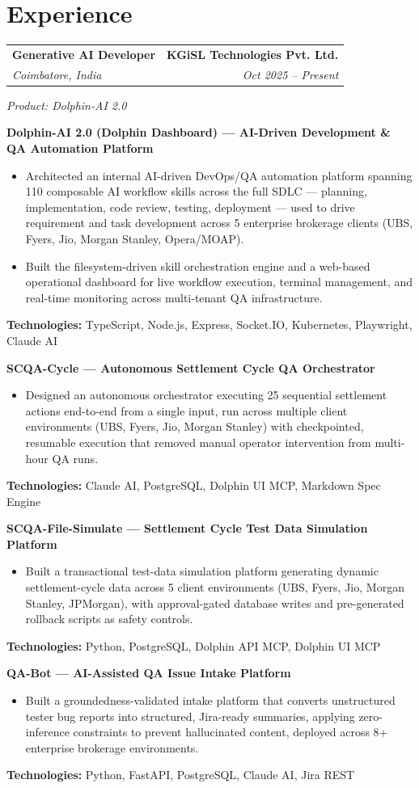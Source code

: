 \documentclass[11pt, letterpaper]{article}
\makeatletter
\newcommand{\jobheading}[4]{%
    \noindent\begin{tabularx}{\textwidth}{@{}X r@{}}
        \fontsize{12}{14}\selectfont\textbf{#1} & \fontsize{12}{14}\selectfont\textbf{#2} \\
        \fontsize{11}{13}\selectfont\textit{#3} & \fontsize{11}{13}\selectfont\textit{#4}
    \end{tabularx}\vspace{2pt}
}
\newcommand{\projectheading}[1]{%
    \vspace{5pt}
    \noindent\fontsize{11}{13}\selectfont\textbf{#1}
    \vspace{3pt}
}
\newcommand{\bulletpoints}[1]{%
    \begin{itemize}[leftmargin=1.4em, itemsep=2pt, topsep=2pt]
        #1
    \end{itemize}
    \vspace{2pt}
}
\newcommand{\bulletitem}[1]{%
    \item \fontsize{11}{12}\selectfont #1
}
\newcommand{\techline}[1]{%
    \noindent\fontsize{10}{12}\selectfont\textbf{Technologies:} #1
    \vspace{4pt}
}
\makeatother
\begin{document}
\vspace{4pt}

\section{Experience}
\jobheading{Generative AI Developer}{KGiSL Technologies Pvt. Ltd.}{Coimbatore, India}{Oct 2025 -- Present}
\noindent\fontsize{11}{13}\selectfont\textit{Product: Dolphin-AI 2.0}\vspace{4pt}

\projectheading{Dolphin-AI 2.0 (Dolphin Dashboard) --- AI-Driven Development \& QA Automation Platform}
\bulletpoints{
\bulletitem{Architected an internal AI-driven DevOps/QA automation platform spanning 110 composable AI workflow skills across the full SDLC --- planning, implementation, code review, testing, deployment --- used to drive requirement and task development across 5 enterprise brokerage clients (UBS, Fyers, Jio, Morgan Stanley, Opera/MOAP).}
\bulletitem{Built the filesystem-driven skill orchestration engine and a web-based operational dashboard for live workflow execution, terminal management, and real-time monitoring across multi-tenant QA infrastructure.}
}
\techline{TypeScript, Node.js, Express, Socket.IO, Kubernetes, Playwright, Claude AI}

\projectheading{SCQA-Cycle --- Autonomous Settlement Cycle QA Orchestrator}
\bulletpoints{
\bulletitem{Designed an autonomous orchestrator executing 25 sequential settlement actions end-to-end from a single input, run across multiple client environments (UBS, Fyers, Jio, Morgan Stanley) with checkpointed, resumable execution that removed manual operator intervention from multi-hour QA runs.}
}
\techline{Claude AI, PostgreSQL, Dolphin UI MCP, Markdown Spec Engine}

\projectheading{SCQA-File-Simulate --- Settlement Cycle Test Data Simulation Platform}
\bulletpoints{
\bulletitem{Built a transactional test-data simulation platform generating dynamic settlement-cycle data across 5 client environments (UBS, Fyers, Jio, Morgan Stanley, JPMorgan), with approval-gated database writes and pre-generated rollback scripts as safety controls.}
}
\techline{Python, PostgreSQL, Dolphin API MCP, Dolphin UI MCP}

\projectheading{QA-Bot --- AI-Assisted QA Issue Intake Platform}
\bulletpoints{
\bulletitem{Built a groundedness-validated intake platform that converts unstructured tester bug reports into structured, Jira-ready summaries, applying zero-inference constraints to prevent hallucinated content, deployed across 8+ enterprise brokerage environments.}
}
\techline{Python, FastAPI, PostgreSQL, Claude AI, Jira REST}
\end{document}
